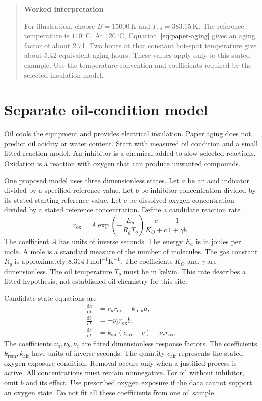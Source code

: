 \documentclass[11pt,a4paper]{report}
\newcommand{\dd}{\mathrm{d}}
\newcommand{\unit}[1]{\,\mathrm{#1}}
\newenvironment{readerbox}[1]{\begin{quote}\color{reportblue}\textbf{#1}\par\normalcolor}{\end{quote}}
\begin{document}
\begin{readerbox}{Worked interpretation}
For illustration, choose $B=15000\unit{K}$ and $T_{\mathrm{ref}}=383.15\unit{K}$.
The reference temperature is $110\,^{\circ}$C.
At $120\,^{\circ}$C, Equation~\ref{eq:paper-aging} gives an aging factor of about 2.71.
Two hours at that constant hot-spot temperature give about 5.42 equivalent aging hours.
These values apply only to this stated example.
Use the temperature convention and coefficients required by the selected insulation model.
\end{readerbox}

\section{Separate oil-condition model}
Oil cools the equipment and provides electrical insulation.
Paper aging does not predict oil acidity or water content.
Start with measured oil condition and a small fitted reaction model.
An inhibitor is a chemical added to slow selected reactions.
Oxidation is a reaction with oxygen that can produce unwanted compounds.

One proposed model uses three dimensionless states.
Let $a$ be an acid indicator divided by a specified reference value.
Let $b$ be inhibitor concentration divided by its stated starting reference value.
Let $c$ be dissolved oxygen concentration divided by a stated reference concentration.
Define a candidate reaction rate
\begin{equation}
r_{\mathrm{ox}}=A\exp\!\left(-\frac{E_a}{R_gT_o}\right)
\frac{c}{K_O+c}\frac{1}{1+\gamma b}.
\end{equation}
The coefficient $A$ has units of inverse seconds.
The energy $E_a$ is in joules per mole.
A mole is a standard measure of the number of molecules.
The gas constant $R_g$ is approximately $8.314\unit{J\,mol^{-1}K^{-1}}$.
The coefficients $K_O$ and $\gamma$ are dimensionless.
The oil temperature $T_o$ must be in kelvin.
This rate describes a fitted hypothesis, not established oil chemistry for this site.

Candidate state equations are
\begin{align}
\frac{\dd a}{\dd t}&=\nu_a r_{\mathrm{ox}}-k_{\mathrm{rem}}a,\\
\frac{\dd b}{\dd t}&=-\nu_b r_{\mathrm{ox}}b,\\
\frac{\dd c}{\dd t}&=k_{\mathrm{air}}(c_{\mathrm{air}}-c)-\nu_c r_{\mathrm{ox}}.
\end{align}
The coefficients $\nu_a,\nu_b,\nu_c$ are fitted dimensionless response factors.
The coefficients $k_{\mathrm{rem}},k_{\mathrm{air}}$ have units of inverse seconds.
The quantity $c_{\mathrm{air}}$ represents the stated oxygen-exposure condition.
Removal occurs only when a justified process is active.
All concentrations must remain nonnegative.
For oil without inhibitor, omit $b$ and its effect.
Use prescribed oxygen exposure if the data cannot support an oxygen state.
Do not fit all these coefficients from one oil sample.
\end{document}
